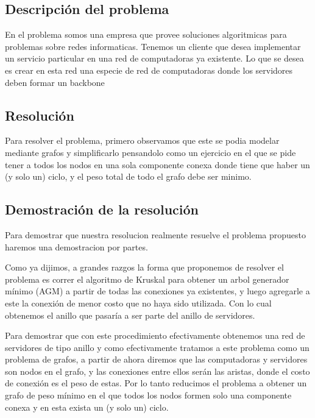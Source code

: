 \subsection{Descripci\'on del problema}

En el problema somos una empresa que provee soluciones algoritmicas para problemas sobre redes informaticas. Tenemos un cliente que desea implementar un servicio particular en una red de computadoras ya existente.
Lo que se desea es crear en esta red una especie de red de computadoras donde los servidores deben formar un backbone 


\newpage

\subsection{Resoluci\'on}

Para resolver el problema, primero observamos que este se podia modelar mediante grafos y simplificarlo pensandolo como un ejercicio en el que se pide tener a todos los nodos en una sola componente conexa donde tiene que haber un (y solo un) ciclo, y el peso total de todo el grafo debe ser minimo.
\begin{itemize}

\end{itemize}


\newpage

\subsection{Demostraci\'on de la resoluci\'on}

Para demostrar que nuestra resolucion realmente resuelve el problema propuesto haremos una demostracion por partes.

Como ya dijimos, a grandes razgos la forma que proponemos de resolver el problema es correr el algoritmo de Kruskal para obtener un arbol generador mínimo (AGM) a partir de todas las conexiones ya existentes, y luego agregarle a este la conexión de menor costo que no haya sido utilizada. Con lo cual obtenemos el anillo que pasaría a ser parte del anillo de servidores.

Para demostrar que con este procedimiento efectivamente obtenemos una red de servidores de tipo anillo y como efectivamente tratamos a este problema como un problema de grafos, a partir de ahora diremos que las computadoras y servidores son nodos en el grafo, y las conexiones entre ellos serán las aristas, donde el costo de conexión es el peso de estas. Por lo tanto reducimos el problema a obtener un grafo de peso mínimo en el que todos los nodos formen solo una componente conexa y en esta exista un (y solo un) ciclo.

